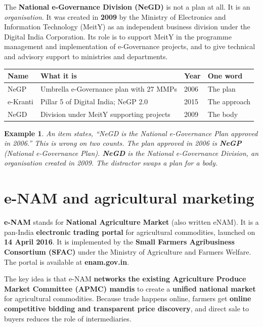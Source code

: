 \documentclass[11pt]{article}
\newtheorem{example}{Example}[section]
\begin{document}
The \textbf{National e-Governance Division (NeGD)} is not a plan at all. It
is an \emph{organisation}. It was created in \textbf{2009} by the Ministry
of Electronics and Information Technology (MeitY) as an independent business
division under the Digital India Corporation. Its role is to support MeitY
in the programme management and implementation of e-Governance projects, and
to give technical and advisory support to ministries and departments.

\begin{center}
\begin{tabular}{p{}p{}p{}p{}}
\toprule
\textbf{Name} & \textbf{What it is} & \textbf{Year} & \textbf{One word} \\
\midrule
NeGP & Umbrella e-Governance plan with 27 MMPs & 2006 & The plan \\
e-Kranti & Pillar 5 of Digital India; NeGP 2.0 & 2015 & The approach \\
NeGD & Division under MeitY supporting projects & 2009 & The body \\
\bottomrule
\end{tabular}
\end{center}

\begin{example}
An item states, ``NeGD is the National e-Governance Plan approved in 2006.''
This is wrong on two counts. The plan approved in 2006 is \textbf{NeGP}
(National e-Governance Plan). \textbf{NeGD} is the National e-Governance
\emph{Division}, an organisation created in 2009. The distractor swaps a
plan for a body.
\end{example}

\section{e-NAM and agricultural marketing}
\textbf{e-NAM} stands for \textbf{National Agriculture Market} (also written
eNAM). It is a pan-India \textbf{electronic trading portal} for agricultural
commodities, launched on \textbf{14 April 2016}. It is implemented by the
\textbf{Small Farmers Agribusiness Consortium (SFAC)} under the Ministry of
Agriculture and Farmers Welfare. The portal is available at
\textbf{enam.gov.in}.

The key idea is that e-NAM \textbf{networks the existing Agriculture Produce
Market Committee (APMC) mandis} to create a \textbf{unified national market}
for agricultural commodities. Because trade happens online, farmers get
\textbf{online competitive bidding and transparent price discovery}, and
direct sale to buyers reduces the role of intermediaries.
\end{document}
